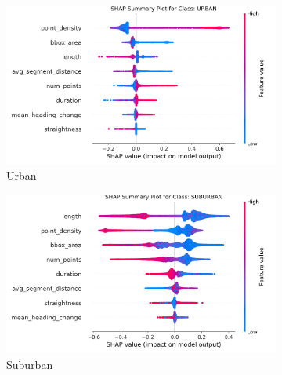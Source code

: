 \documentclass[a4paper,12pt,twoside]{scrreprt}
\begin{document}
\begin{figure}[p]
  \centering

  \begin{subfigure}[b]{0.495\textwidth}
    \centering

    \includegraphics[width=\textwidth]{Figures/classifier/shap/shap_summary_for_URBAN.png}
    \caption{Urban}
    \label{fig:shap_urban}
  \end{subfigure}
  \hfill
  \begin{subfigure}[b]{0.495\textwidth}
    \centering

    \includegraphics[width=\textwidth]{Figures/classifier/shap/shap_summary_for_SUBURBAN.png}
    \caption{Suburban}
    \label{fig:shap_suburban}
  \end{subfigure}

  \vspace{1cm}

  \begin{subfigure}[b]{0.495\textwidth}
    \centering


\end{subfigure}
\end{figure}
\end{document}
